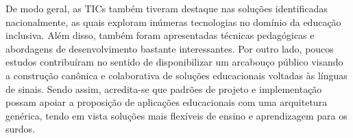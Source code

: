 De modo geral, as TICs também tiveram destaque nas soluções identificadas nacionalmente, as quais exploram inúmeras tecnologias no domínio da educação inclusiva. Além disso, também foram apresentadas técnicas pedagógicas e abordagens de desenvolvimento bastante interessantes. Por outro lado, poucos estudos contribuíram no sentido de disponibilizar um arcabouço público visando a construção canônica e colaborativa de soluções educacionais voltadas às línguas de sinais. Sendo assim, acredita-se que padrões de projeto e implementação possam apoiar a proposição de aplicações educacionais com uma arquitetura genérica, tendo em vista soluções mais flexíveis de ensino e aprendizagem para os surdos.






